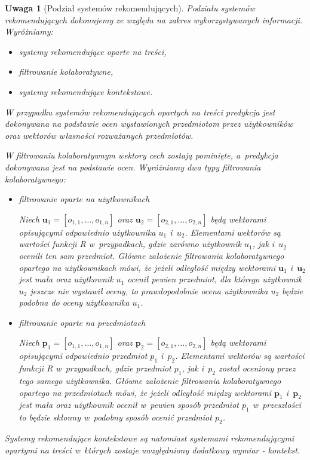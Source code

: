 \documentclass[12pt,a4paper]{report}
\newtheorem{uwaga}[df]{Uwaga}
\begin{document}
\begin{uwaga}[Podział systemów rekomendujących]
Podziału systemów rekomendujących dokonujemy ze względu na zakres wykorzystywanych informacji. Wyróżniamy:
\begin{itemize}
\item systemy rekomendujące oparte na treści,
\item filtrowanie kolaboratywne,
\item systemy rekomendujące kontekstowe.
\end{itemize}

W przypadku systemów rekomendujących opartych na treści predykcja jest dokonywana na podstawie ocen wystawionych przedmiotom przez użytkowników oraz wektorów własności rozważanych przedmiotów. 

W filtrowaniu kolaboratywnym wektory cech zostają pominięte, a~predykcja dokonywana jest na podstawie ocen. Wyróżniamy dwa typy filtrowania kolaboratywnego:
\begin{itemize}
\item filtrowanie oparte na użytkownikach

Niech $\mathbf{u}_1 = [o_{1,1}, \ldots, o_{1,n}]$ oraz $\mathbf{u}_2 = [o_{2,1}, \ldots, o_{2,n}]$ będą wektorami opisującymi odpowiednio użytkownika $u_1$ i~$u_2$. Elementami wektorów są wartości funkcji R w~przypadkach, gdzie zarówno użytkownik $u_1$, jak i~$u_2$ ocenili ten sam przedmiot. Główne założenie filtrowania kolaboratywnego opartego na użytkownikach mówi, że jeżeli odległość między wektorami $\mathbf{u}_1$ i~$\mathbf{u}_2$ jest mała oraz użytkownik $u_1$ ocenił pewien przedmiot, dla którego użytkownik $u_2$ jeszcze nie wystawił oceny, to prawdopodobnie ocena użytkownika $u_2$ będzie podobna do oceny użytkownika $u_1$.
\item filtrowanie oparte na przedmiotach

Niech $\mathbf{p}_1 = [o_{1,1}, \ldots, o_{1,n}]$ oraz $\mathbf{p}_2 = [o_{2,1}, \ldots, o_{2,n}]$ będą wektorami opisującymi odpowiednio przedmiot $p_1$ i~$p_2$. Elementami wektorów są wartości funkcji R w~przypadkach, gdzie przedmiot $p_1$, jak i~$p_2$ został oceniony przez tego samego użytkownika. Główne założenie filtrowania kolaboratywnego opartego na przedmiotach mówi, że jeżeli odległość między wektorami $\mathbf{p}_1$ i~$\mathbf{p}_2$ jest mała oraz użytkownik ocenił w~pewien sposób przedmiot $p_1$ w~przeszłości to będzie skłonny w~podobny sposób ocenić przedmiot $p_2$.
\end{itemize}

Systemy rekomendujące kontekstowe są natomiast systemami rekomendującymi opartymi na treści w~których zostaje uwzględniony dodatkowy wymiar - kontekst.
\end{uwaga}
\end{document}
